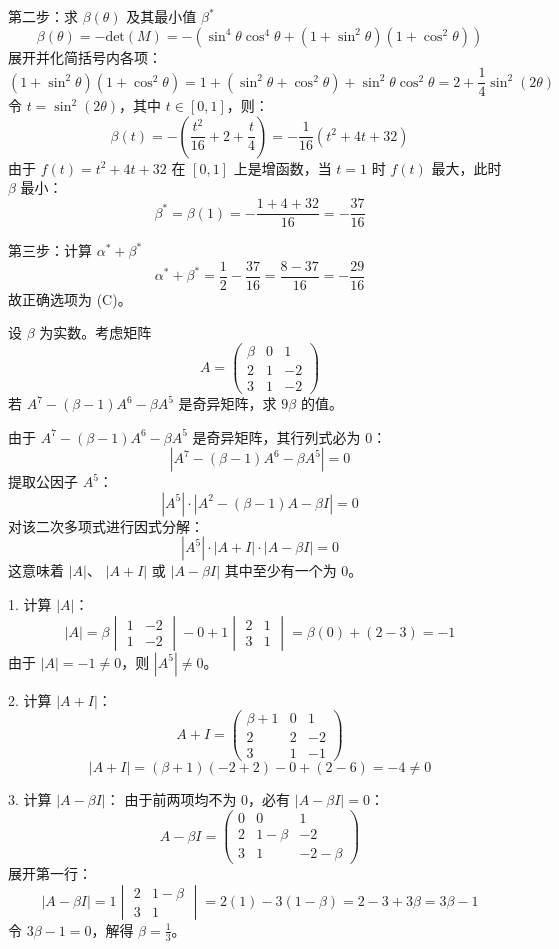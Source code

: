 \begin{questions}
\begin{solution}
第二步：求 $\beta(\theta)$ 及其最小值 $\beta^*$
\[
\beta(\theta) = -\text{det}(M) = -(\sin^4 \theta \cos^4 \theta + (1 + \sin^2 \theta)(1 + \cos^2 \theta))
\]
展开并化简括号内各项：
\[
(1 + \sin^2 \theta)(1 + \cos^2 \theta) = 1 + (\sin^2 \theta + \cos^2 \theta) + \sin^2 \theta \cos^2 \theta = 2 + \frac{1}{4} \sin^2(2\theta)
\]
令 $t = \sin^2(2\theta)$，其中 $t \in [0, 1]$，则：
\[
\beta(t) = -(\frac{t^2}{16} + 2 + \frac{t}{4}) = -\frac{1}{16}(t^2 + 4t + 32)
\]
由于 $f(t) = t^2 + 4t + 32$ 在 $[0, 1]$ 上是增函数，当 $t=1$ 时 $f(t)$ 最大，此时 $\beta$ 最小：
\[
\beta^* = \beta(1) = -\frac{1 + 4 + 32}{16} = -\frac{37}{16}
\]

第三步：计算 $\alpha^* + \beta^*$
\[
\alpha^* + \beta^* = \frac{1}{2} - \frac{37}{16} = \frac{8 - 37}{16} = -\frac{29}{16}
\]
故正确选项为 (C)。
\end{solution}

    \question
设 $\beta$ 为实数。考虑矩阵
\[
A = \begin{pmatrix} \beta & 0 & 1 \\ 2 & 1 & -2 \\ 3 & 1 & -2 \end{pmatrix}
\]
若 $A^7 - (\beta - 1)A^6 - \beta A^5$ 是奇异矩阵，求 $9\beta$ 的值。

\begin{solution}
由于 $A^7 - (\beta - 1)A^6 - \beta A^5$ 是奇异矩阵，其行列式必为 0：
\[
|A^7 - (\beta - 1)A^6 - \beta A^5| = 0
\]
提取公因子 $A^5$：
\[
|A^5| \cdot |A^2 - (\beta - 1)A - \beta I| = 0
\]
对该二次多项式进行因式分解：
\[
|A^5| \cdot |A + I| \cdot |A - \beta I| = 0
\]
这意味着 $|A|$、 $|A + I|$ 或 $|A - \beta I|$ 其中至少有一个为 0。

1. 计算 $|A|$：
\[
|A| = \beta \begin{vmatrix} 1 & -2 \\ 1 & -2 \end{vmatrix} - 0 + 1 \begin{vmatrix} 2 & 1 \\ 3 & 1 \end{vmatrix} = \beta(0) + (2 - 3) = -1
\]
由于 $|A| = -1 \neq 0$，则 $|A^5| \neq 0$。

2. 计算 $|A + I|$：
\[
A + I = \begin{pmatrix} \beta + 1 & 0 & 1 \\ 2 & 2 & -2 \\ 3 & 1 & -1 \end{pmatrix}
\]
\[
|A + I| = (\beta + 1)(-2 + 2) - 0 + (2 - 6) = -4 \neq 0
\]

3. 计算 $|A - \beta I|$：
由于前两项均不为 0，必有 $|A - \beta I| = 0$：
\[
A - \beta I = \begin{pmatrix} 0 & 0 & 1 \\ 2 & 1 - \beta & -2 \\ 3 & 1 & -2 - \beta \end{pmatrix}
\]
展开第一行：
\[
|A - \beta I| = 1 \begin{vmatrix} 2 & 1 - \beta \\ 3 & 1 \end{vmatrix} = 2(1) - 3(1 - \beta) = 2 - 3 + 3\beta = 3\beta - 1
\]
令 $3\beta - 1 = 0$，解得 $\beta = \frac{1}{3}$。


\end{solution}
\end{questions}
